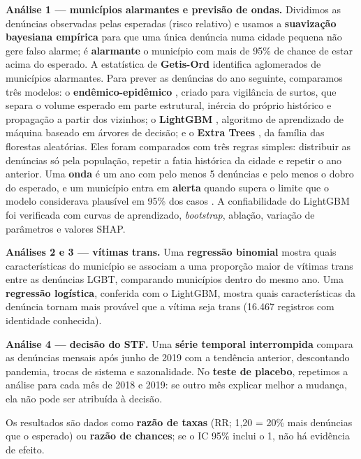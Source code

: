 \documentclass[12pt]{article}
\begin{document}
\textbf{Análise 1 --- municípios alarmantes e previsão de ondas.} Dividimos as denúncias observadas pelas esperadas (risco relativo) e usamos a \textbf{suavização bayesiana empírica} \cite{marshall:1991} para que uma única denúncia numa cidade pequena não gere falso alarme; é \textbf{alarmante} o município com mais de 95\% de chance de estar acima do esperado. A estatística de \textbf{Getis-Ord} \cite{getis_ord:1992} identifica aglomerados de municípios alarmantes. Para prever as denúncias do ano seguinte, comparamos três modelos: o \textbf{endêmico-epidêmico} \cite{held_hohle_hofmann:2005}, criado para vigilância de surtos, que separa o volume esperado em parte estrutural, inércia do próprio histórico e propagação a partir dos vizinhos; o \textbf{LightGBM} \cite{ke:2017}, algoritmo de aprendizado de máquina baseado em árvores de decisão; e o \textbf{Extra Trees} \cite{geurts:2006}, da família das florestas aleatórias. Eles foram comparados com três regras simples: distribuir as denúncias só pela população, repetir a fatia histórica da cidade e repetir o ano anterior. Uma \textbf{onda} é um ano com pelo menos 5 denúncias e pelo menos o dobro do esperado, e um município entra em \textbf{alerta} quando supera o limite que o modelo considerava plausível em 95\% dos casos \cite{farrington:1996}. A confiabilidade do LightGBM foi verificada com curvas de aprendizado, \textit{bootstrap}, ablação, variação de parâmetros e valores SHAP.

\textbf{Análises 2 e 3 --- vítimas trans.} Uma \textbf{regressão binomial} mostra quais características do município se associam a uma proporção maior de vítimas trans entre as denúncias LGBT, comparando municípios dentro do mesmo ano. Uma \textbf{regressão logística}, conferida com o LightGBM, mostra quais características da denúncia tornam mais provável que a vítima seja trans (16.467 registros com identidade conhecida).

\textbf{Análise 4 --- decisão do STF.} Uma \textbf{série temporal interrompida} \cite{bernal:2017} compara as denúncias mensais após junho de 2019 com a tendência anterior, descontando pandemia, trocas de sistema e sazonalidade. No \textbf{teste de placebo}, repetimos a análise para cada mês de 2018 e 2019: se outro mês explicar melhor a mudança, ela não pode ser atribuída à decisão.

Os resultados são dados como \textbf{razão de taxas} (RR; 1,20 = 20\% mais denúncias que o esperado) ou \textbf{razão de chances}; se o IC 95\% inclui o 1, não há evidência de efeito. 
\end{document}

